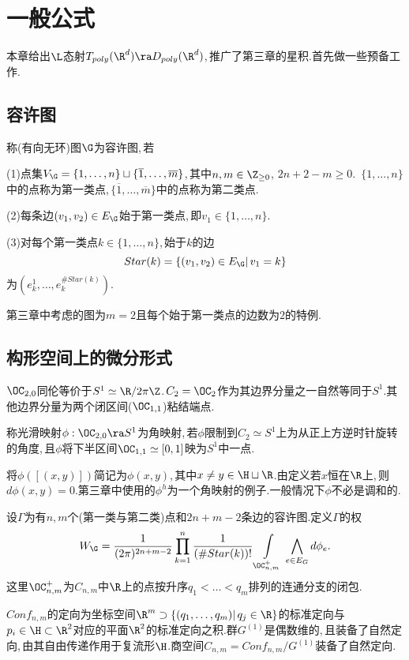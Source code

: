 \chapter{一般公式}
本章给出$\L$态射$T_{poly}(\R^d)\ra D_{poly}(\R^d)$,\,推广了第三章的星积.首先做一些预备工作.

\section{容许图}

称(有向无环)图$\G$为容许图,\,若

(1)点集$V_\G=\{1,\dots,n\}\sqcup \{{\overline 1},\dots,{\overline m}
      \}$,\,其中$n,m\in \Z_{\ge 0}$,\,\,$2n+2-m\ge 0$.\, $\{1,\dots ,n\}$中的点称为第一类点,\,$\{ {\overline 1},\dots,{\overline m}\}$中的点称为第二类点.

(2)每条边$(v_1,v_2)\in E_\G$始于第一类点,\,即$v_1\in \{1,\dots,n\}$.

(3)对每个第一类点$k\in\{1,\dots,n\}$,\,始于$k$的边
$$Star(k)=\{(v_1,v_2)\in E_\G| \,v_1=k\}$$
为$(e_k^1,\dots,e_k^{\# Star(k)})$.

第三章中考虑的图为$m=2$且每个始于第一类点的边数为$2$的特例.



\section{构形空间上的微分形式}

$\OC_{2,0}$同伦等价于$S^1\simeq\R/2\pi\Z$.\,$C_2=\OC_2$作为其边界分量之一自然等同于$S^1$.其他边界分量为两个闭区间($\OC_{1,1}$)粘结端点.

称光滑映射$\phi: \OC_{2,0}\ra S^1$为角映射,\,若$\phi$限制到$C_2\simeq S^1$上为从正上方逆时针旋转的角度,\,且$\phi$将下半区间$\OC_{1,1}\simeq [0,1]$映为$S^1$中一点.

将$\phi([(x,y)])$简记为$\phi(x,y)$,\,其中$x\ne y\in \H\sqcup \R$.由定义若$x$恒在$\R$上,\,则$d\phi(x,y)=0$.第三章中使用的$\phi^{h}$为一个角映射的例子.一般情况下$\phi$不必是调和的.

设$\Gamma$为有$n,m$个(第一类与第二类)点和$2n+m-2$条边的容许图.定义$\Gamma$的权
$$W_\G={1\over (2\pi)^{2n+m-2}}
       \prod_{k=1}^n {1\over
(\# Star (k))!} 
        \int\limits_{\OC_{n,m}^+}\,\bigwedge _{e\in E_G} 
        d\phi_e.$$
这里$\OC_{n,m}^+$为$C_{n,m}$中$\R$上的点按升序$q_1<\dots<q_m$排列的连通分支的闭包.

$Conf_{n,m}$的定向为坐标空间$\R^m\supset \{(q_1,\dots,q_m)|\,q_j\in \R\}$的标准定向与$p_i\in\H \subset \R^2$对应的平面$\R^2$的标准定向之积.群$G^{(1)}$是偶数维的,\,且装备了自然定向,\,由其自由传递作用于复流形$\H$.商空间$C_{n,m}=Conf_{n,m}/G^{(1)}$装备了自然定向.

